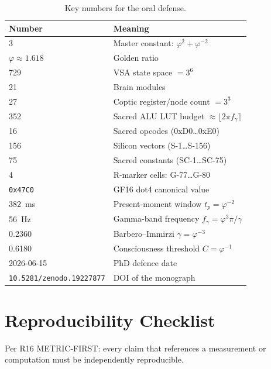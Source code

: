 \begin{table}[h]
\centering
\caption{Key numbers for the oral defense.}
\label{tab:defense-numbers}
\begin{tabular}{ll}
\hline
Number & Meaning \\
\hline
3 & Master constant: \(\varphi^2 + \varphi^{-2}\) \\
\(\varphi \approx 1.618\) & Golden ratio \\
729 & VSA state space \(= 3^6\) \\
21 & Brain modules \\
27 & Coptic register/node count \(= 3^3\) \\
352 & Sacred ALU LUT budget \(\approx \lfloor 2\pi f_\gamma\rceil\) \\
16 & Sacred opcodes (0xD0\ldots0xE0) \\
156 & Silicon vectors (S-1\ldots S-156) \\
75 & Sacred constants (SC-1\ldots SC-75) \\
4 & R-marker cells: G-77\ldots G-80 \\
\texttt{0x47C0} & GF16 dot4 canonical value \\
382~ms & Present-moment window \(t_p = \varphi^{-2}\) \\
56~Hz & Gamma-band frequency \(f_\gamma = \varphi^3\pi/\gamma\) \\
0.2360 & Barbero--Immirzi \(\gamma = \varphi^{-3}\) \\
0.6180 & Consciousness threshold \(C = \varphi^{-1}\) \\
2026-06-15 & PhD defence date \\
\texttt{10.5281/zenodo.19227877} & DOI of the monograph \\
\hline
\end{tabular}
\end{table}


\section{Reproducibility Checklist}
\label{sec:flos74-repro}

Per R16 METRIC-FIRST: every claim that references a measurement or computation
must be independently reproducible.

